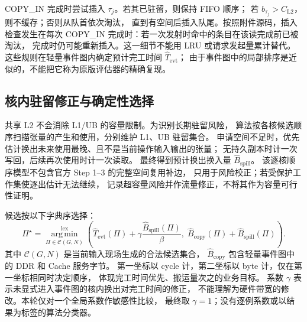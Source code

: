 COPY\_IN 完成时尝试插入 $\tau_j$。若其已驻留，则保持 FIFO 顺序；
若 $b_{\tau_j}>C_{\mathrm{L2}}$，则不缓存；否则从队首依次淘汰，
直到有空间后插入队尾。按照附件源码，插入检查发生在每次
COPY\_IN 完成时：若一次发射时命中的条目在该读完成前已被淘汰，
完成时仍可能重新插入。这一细节不能用 LRU 或请求发起量累计替代。
这些规则在轻量事件图内确定预计完工时间 $\widehat T_{\mathrm{evt}}$；
由于事件图中的局部排序是近似的，不能把它称为原版评估器的精确复现。

\subsection{核内驻留修正与确定性选择}
共享 L2 不会消除 L1/UB 的容量限制。为识别长期驻留风险，
算法按各核候选顺序扫描张量的产生和使用，分别维护 L1、UB 驻留集合。
申请空间不足时，优先估计换出未来使用最晚、且不是当前操作输入输出的张量；
无持久副本时计一次写回，后续再次使用时计一次读取。
最终得到预计换出换入量 $\widehat B_{\mathrm{spill}}$。
该逐核顺序模型不包含官方 Step 1--3 的完整空间复用补边，
只用于风险校正；若受保护工作集使逐出估计无法继续，
记录超容量风险并作流量修正，不将其作为容量可行性证明。

候选按以下字典序选择：
\begin{equation}
\Pi^\star=
\operatorname*{arg\,min}_{\Pi\in\mathcal C(G,N)}^{\mathrm{lex}}
\left(
\widehat T_{\mathrm{evt}}(\Pi)+
\gamma\frac{\widehat B_{\mathrm{spill}}(\Pi)}{\beta},
\;\widehat B_{\mathrm{copy}}(\Pi)+\widehat B_{\mathrm{spill}}(\Pi)
\right).
\label{eq:q3-objective}
\end{equation}
其中 $\mathcal C(G,N)$ 是当前输入现场生成的合法候选集合，
$\widehat B_{\mathrm{copy}}$ 包含轻量事件图中的 DDR 和 Cache 服务字节。
第一坐标以 cycle 计，第二坐标以 byte 计，仅在第一坐标相同时决定顺序，
体现完工时间优先、搬运量次之的业务目标。
系数 $\gamma$ 表示未显式进入事件图的核内换出对完工时间的修正，
不能理解为硬件带宽的修改。本轮仅对一个全局系数作敏感性比较，
最终取 $\gamma=1$；没有逐例系数或以结果为标签的算法分类器。

